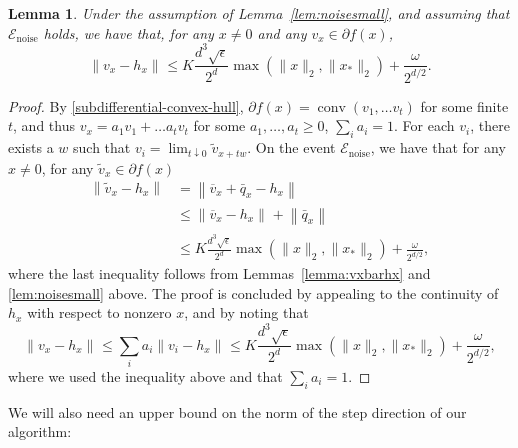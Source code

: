 \documentclass[11pt]{article}
\newtheorem{lemma}[theorem]{Lemma}
\newcommand{\eps}{\epsilon}
\newcommand{\xo}{x_\ast}
\newcommand{\vbarx}{\overline{v}_{x}}
\newcommand{\hx}{h_x}
\DeclareMathOperator{\conv}{conv}
\newcommand{\Tnorm}{}
\newcommand\norm[2][\Tnorm]{\ensuremath{{\left\|#2\right\|}_{#1}}}
\newcommand\qbarx{\bar q_x}
\newcommand\eventnoisesmall{\mathcal E_{\text{noise}}}
\newcommand\stepdir[1]{\tilde v_{#1}}
\newcommand{\whcomm}[2]{{\color{black} #1}{\color{black} #2}} %
\begin{document}
\begin{lemma} \label{lemma:vxtilde-hxtilde-subdifferential}
Under the assumption of Lemma~\ref{lem:noisesmall}, and assuming that $\eventnoisesmall$ holds, we have that, for any $x\neq 0$ and any  $v_x \in \partial f(x)$,
\[
\norm{v_x - h_x} \leq K \frac{d^3 \sqrt{\eps}}{2^d} \max ( \|x\|_2, \| \xo\|_2) + \frac{\omega}{2^{d/2}}.
\]
\end{lemma}
\begin{proof}
By \eqref{subdifferential-convex-hull}, $\partial f(x) = \conv(v_1, \ldots v_t)$ for some finite $t$,
and thus $v_x = a_1 v_1 + \ldots a_t v_t$ for some $a_1,\ldots,a_t  \geq 0$, $\sum_i a_i = 1$.
For each $v_i$, there exists a $w$ such that $v_i = \lim_{t \downarrow 0} \tilde{v}_{x + t w}$.  On the event $\eventnoisesmall$, we have that for any $x \neq 0$, for any  $\stepdir{x} \in \partial f(x)$
\begin{align}
\norm{\stepdir{x} - \hx}
&=
\norm{\vbarx + \qbarx-\hx} \nonumber \\
&\leq
\norm{\vbarx-\hx} + \norm{\qbarx} \nonumber \\
&\leq
K \frac{d^3 \sqrt{\eps}}{2^d} \max ( \|x\|_2, \| \xo\|_2)
+
\frac{\omega}{2^{d/2}}, \nonumber
\end{align}
where the last inequality follows from Lemmas~\ref{lemma:vxbarhx} and \ref{lem:noisesmall} above.  The proof is concluded by appealing to the continuity of $h_x$ with respect to nonzero $x$, and by  noting that
\[
\norm{v_x - h_x}
\leq \sum_i a_i \norm{v_i - h_x}
\leq K \frac{d^3 \sqrt{\eps}}{2^d} \max ( \|x\|_2, \| \xo\|_2)
+
\frac{\omega}{2^{d/2}},
\]
where we used the inequality above and that $\sum_i a_i = 1$.
\end{proof}

We will also need an upper bound on the norm of the step direction of our algorithm:
\end{document}

